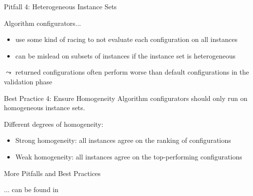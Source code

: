\begin{frame}[c]{Pitfall 4: Heterogeneous Instance Sets}

Algorithm configurators...
\begin{itemize}
	\item use some kind of racing to not evaluate each configuration on all instances
	\pause
	\item can be mislead on subsets of instances if the instance set is heterogeneous
\end{itemize}

\pause
$\leadsto$ returned configurations often perform worse than default configurations in the validation phase

\bigskip
\pause

\begin{block}{Best Practice 4: Ensure Homogeneity}
	Algorithm configurators should only run on homogeneous instance sets.
	
	Different degrees of homogeneity:
	\begin{itemize}
		\item Strong homogeneity: all instances agree on the ranking of configurations
		\item Weak homogeneity: all instances agree on the top-performing configurations
	\end{itemize}

\end{block}

\end{frame}

\begin{frame}[c]{More Pitfalls and Best Practices}

... can be found in 


\end{frame}



